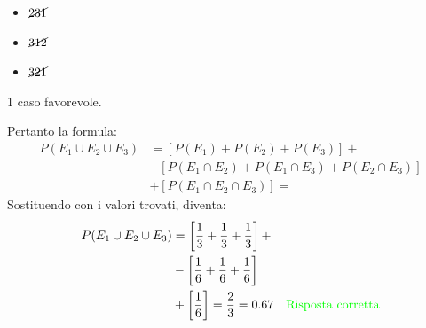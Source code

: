 \documentclass{article}  %
\theoremstyle{definition}
\begin{document}
\begin{esercizio}[Esercizio]
\begin{itemize}
\begin{itemize}
			      \item $\cancel{231}$
			      \item $\cancel{312}$
			      \item $\cancel{321}$
		      \end{itemize}
		      1 caso favorevole.
	\end{itemize}
	Pertanto la formula:
	\begin{align*}
		P(E_1 \cup E_2 \cup E_3)
		 & = [P(E_1)+P(E_2)+P(E_3)] +                          \\
		 & - [P(E_1 \cap E_2)+P(E_1 \cap E_3)+P(E_2 \cap E_3)] \\
		 & + [P(E_1 \cap E_2 \cap E_3)] =
	\end{align*}
	Sostituendo con i valori trovati, diventa:
	\begin{align*}
		P(E_1 \cup E_2 \cup E_3)
		 & = \left[\frac{1}{3}+\frac{1}{3}+\frac{1}{3}\right] +                                            \\
		 & - \left[\frac{1}{6}+\frac{1}{6}+\frac{1}{6}\right]                                              \\
		 & + \left[\frac{1}{6}\right] = \frac{2}{3}=0.67 \quad \textcolor{green}{\text{Risposta corretta}}
	\end{align*}


\end{esercizio}
\end{document}

